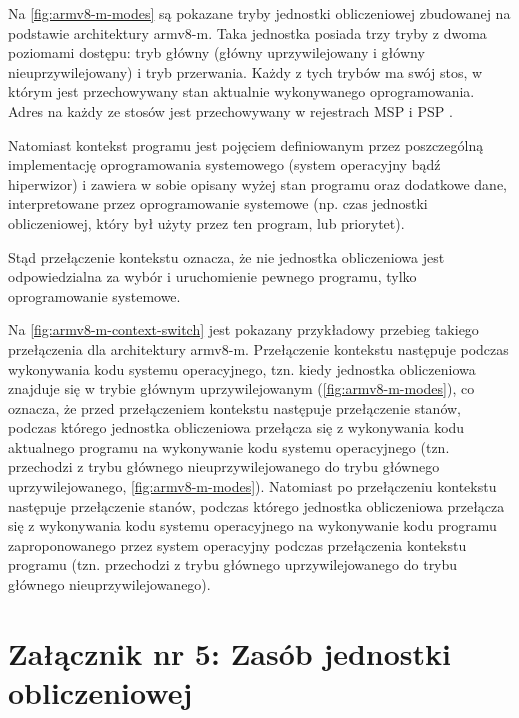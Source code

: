 \documentclass[../main]{subfiles}
\begin{document}
Na \cref{fig:armv8-m-modes} są pokazane tryby jednostki obliczeniowej zbudowanej na podstawie
architektury \acrshort{arm}v8-\acrshort{m}. Taka jednostka posiada trzy tryby z dwoma poziomami
dostępu: tryb główny (główny uprzywilejowany i główny nieuprzywilejowany) i tryb przerwania. Każdy z
tych trybów ma swój stos, w którym jest przechowywany stan aktualnie wykonywanego oprogramowania.
Adres na każdy ze stosów jest przechowywany w rejestrach MSP i PSP \cite{armv8mintro}.

Natomiast kontekst programu jest pojęciem definiowanym przez poszczególną implementację oprogramowania
systemowego (system operacyjny bądź hiperwizor) i zawiera w sobie opisany wyżej stan programu oraz
dodatkowe dane, interpretowane przez oprogramowanie systemowe (np. czas jednostki obliczeniowej, który
był użyty przez ten program, lub priorytet).

Stąd przełączenie kontekstu oznacza, że nie jednostka obliczeniowa jest odpowiedzialna za wybór i
uruchomienie pewnego programu, tylko oprogramowanie systemowe.

Na \cref{fig:armv8-m-context-switch} jest pokazany przykładowy przebieg takiego przełączenia dla
architektury \acrshort{arm}v8-\acrshort{m}. Przełączenie kontekstu następuje podczas wykonywania kodu
systemu operacyjnego, tzn. kiedy jednostka obliczeniowa znajduje się w trybie głównym uprzywilejowanym
(\cref{fig:armv8-m-modes}), co oznacza, że przed przełączeniem kontekstu następuje przełączenie
stanów, podczas którego jednostka obliczeniowa przełącza się z wykonywania kodu aktualnego programu na
wykonywanie kodu systemu operacyjnego (tzn. przechodzi z trybu głównego nieuprzywilejowanego do trybu
głównego uprzywilejowanego, \cref{fig:armv8-m-modes}). Natomiast po przełączeniu kontekstu następuje
przełączenie stanów, podczas którego jednostka obliczeniowa przełącza się z wykonywania kodu systemu
operacyjnego na wykonywanie kodu programu zaproponowanego przez system operacyjny podczas przełączenia
kontekstu programu (tzn. przechodzi z trybu głównego uprzywilejowanego do trybu głównego
nieuprzywilejowanego).

\section*{Załącznik nr 5: Zasób jednostki obliczeniowej}\label{sec:zalacznik-5}
\end{document}
